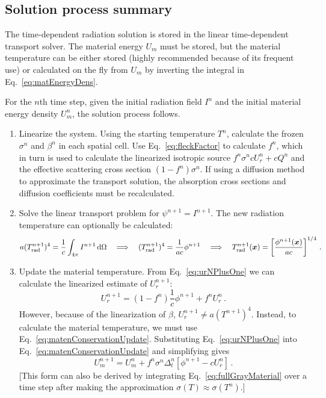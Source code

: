 \subsection{Solution process summary}
The time-dependent radiation solution is stored in the linear time-dependent
transport solver. The material energy $U_m$ must be stored, but the
material temperature can be either stored (highly recommended because of its
frequent use) or calculated on the fly from $U_m$ by inverting the integral in
Eq.~\eqref{eq:matEnergyDens}.

For the $n$th time step, given the initial radiation field $I^{n}$ and the
initial material energy density $U_m^n$, the solution process follows.
\prelistpar
\begin{enumerate}
  \item Linearize the system. Using the starting temperature $T^n$, calculate
    the frozen $\sigma^n$ and $\beta^n$ in each spatial cell. Use
    Eq.~\eqref{eq:fleckFactor} to calculate $f^n$, which in turn is used to
    calculate the linearized isotropic source $f^n \sigma^n c U_r^n + c Q^n$
    and the effective scattering cross section $\left(1 - f^n\right) \sigma^n$.
    If using a diffusion method to approximate the transport solution, the
    absorption cross sections and diffusion coefficients must be recalculated.
  \item Solve the linear transport problem for $\psi^{n+1}=I^{n+1}$. The new
    radiation
    temperature can optionally be calculated:
    \begin{equation*}
      a (T_\text{rad}^{n+1})^4 = \frac{1}{c} \int_{4\pi} I^{n+1}
      \mathop{}\!\mathrm{d} \Omega
      \quad \Longrightarrow \quad
      (T_\text{rad}^{n+1})^4 = \frac{1}{ac} \phi^{n+1}
      \quad \Longrightarrow \quad
      T_\text{rad}^{n+1}(\bm{x}) = \left[ \frac{\phi^{n+1}(\bm{x})}{ac} \right]^{1/4}\,.
    \end{equation*}
  \item Update the material temperature. From Eq.~\eqref{eq:urNPlusOne}
    we can calculate the linearized estimate of $U_r^{n+1}$:
    \begin{equation*}
      U_r^{n+1} = \left(1 - f^n\right) \frac1c \phi^{n+1}  + f^n U_r^n\,.
    \end{equation*}
    However, because of the linearization of $\beta$, $U_r^{n+1} \ne a
    (T^{n+1})^4$. Instead, to calculate the material temperature, we must use
    Eq.~\eqref{eq:matenConservationUpdate}. Substituting
    Eq.~\eqref{eq:urNPlusOne} into Eq.~\eqref{eq:matenConservationUpdate}
    and simplifying gives
    \begin{equation}\label{eq:matenConservationUpdate2}
      U_m^{n+1} =  U_m^n + f^n \sigma^n \Delta_t^n \left[ \phi^{n+1} - c U_r^n \right] \,.
    \end{equation}
    [This form can also be derived by integrating
    Eq.~\eqref{eq:fullGrayMaterial} over a time step after making the
    approximation $\sigma(T) \approx \sigma(T^n)$.]
\end{enumerate}

